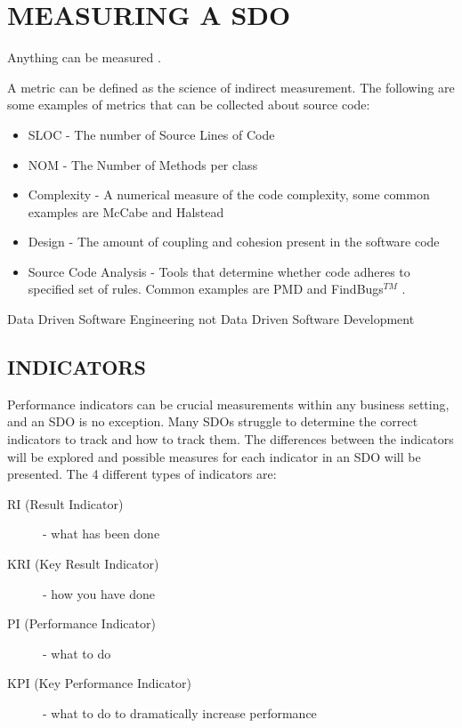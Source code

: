 \documentclass[SDSUThesis.tex]{subfiles}
\begin{document}
\section{MEASURING A SDO}

Anything can be measured \cite{Hubbard2010}.

A metric can be defined as the science of indirect measurement.
    The following are some examples of metrics that can be collected 
    about source code:
    \begin{itemize}
        \item SLOC - The number of Source Lines of Code 
        \item NOM - The Number of Methods per class
        \item Complexity - A numerical measure of the code complexity,
            some common examples are McCabe \cite{McCabe1976} and 
            Halstead \cite{Halstead1977}
        \item Design - The amount of coupling and cohesion present 
        in the software code
        \item Source Code Analysis - Tools that determine whether 
        code adheres to specified set of rules. Common 
        examples are PMD and FindBugs$^{TM}$ \cite{PMD, Findbugs}.
    \end{itemize}

Data Driven Software Engineering not Data Driven Software Development

\subsection{INDICATORS}
Performance indicators can be crucial measurements
within any business setting, and an SDO is no exception. Many
SDOs struggle to determine the correct indicators to track and
how to track them.  
The differences between the indicators will be explored and
possible measures for each indicator in an SDO will be
presented.  The 4 different types of indicators are:
\begin{description}
  \item[RI (Result Indicator)] - what has been done
  \item[KRI (Key Result Indicator)] - how you have done
  \item[PI (Performance Indicator)] - what to do
  \item[KPI (Key Performance Indicator)] - what to do to dramatically increase performance
\end{description}
\end{document}

